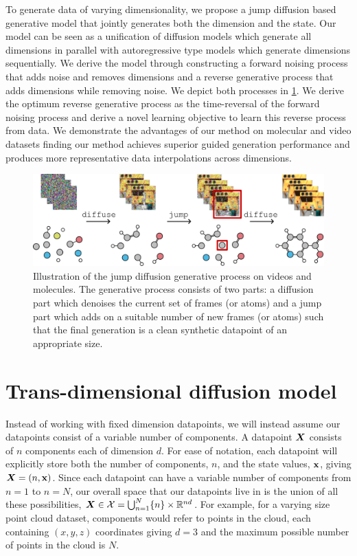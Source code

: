 To generate data of varying dimensionality, we propose a jump diffusion based generative model that jointly generates both the dimension and the state. Our model can be seen as a unification of diffusion models which generate all dimensions in parallel with autoregressive type models which generate dimensions sequentially. We derive the model through constructing a forward noising process that adds noise and removes dimensions and a reverse generative process that adds dimensions while removing noise. We depict both processes in \cref{fig:tddm-fig1}. We derive the optimum reverse generative process as the time-reversal of the forward noising process and derive a novel learning objective to learn this reverse process from data. We demonstrate the advantages of our method on molecular and video datasets finding our method achieves superior guided generation performance and produces more representative data interpolations across dimensions.

\begin{figure}
    \centering
    \includegraphics[width=\textwidth]{figs/tddm/fig1.pdf}
    \caption{Illustration of the jump diffusion generative process on videos and molecules. The generative process consists of two parts: a diffusion part which denoises the current set of frames (or atoms) and a jump part which adds on a suitable number of new frames (or atoms) such that the final generation is a clean synthetic datapoint of an appropriate size.
    }
    \label{fig:tddm-fig1}
\end{figure}


\section{Trans-dimensional diffusion model}
Instead of working with fixed dimension datapoints, we will instead assume our datapoints consist of a variable number of components. A datapoint ${\bm{X}}$ consists of $n$ components each of dimension $d$. For ease of notation, each datapoint will explicitly store both the number of components, $n$, and the state values, ${\mathbf{x}}$, giving ${\bm{X}} = (n, {\mathbf{x}})$. Since each datapoint can have a variable number of components from $n=1$ to $n=N$, our overall space that our datapoints live in is the union of all these possibilities, ${\bm{X}} \in {\mathcal{X}} = \bigcup_{n=1}^N \{n \} \times \mathbb{R}^{nd}$. For example, for a varying size point cloud dataset, components would refer to points in the cloud, each containing $(x,y,z)$ coordinates giving $d=3$ and the maximum possible number of points in the cloud is $N$.

